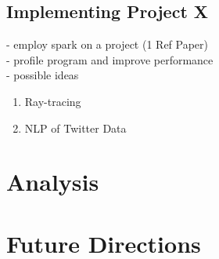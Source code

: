 \documentclass{article}
\begin{document}
\subsection*{Implementing Project X}

- employ spark on a project (1 Ref Paper) \\
- profile program and improve performance \\
- possible ideas
\begin{enumerate}
    \item Ray-tracing
    \item NLP of Twitter Data
\end{enumerate}


\section*{Analysis}

\section*{Future Directions}



\end{document}
